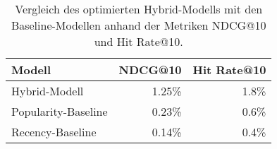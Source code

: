 
\begin{table}[htbp]
    \centering
    \caption{Vergleich des optimierten Hybrid-Modells mit den Baseline-Modellen anhand der Metriken NDCG@10 und Hit Rate@10.}
    \label{tab:baseline_vergleich}
    \begin{tabular}{lrr}
        \toprule
        \textbf{Modell} & \textbf{NDCG@10} & \textbf{Hit Rate@10} \\
        \midrule
        Hybrid-Modell & 1.25\% & 1.8\% \\
        Popularity-Baseline        & 0.23\% & 0.6\% \\
        Recency-Baseline           & 0.14\% & 0.4\% \\
        \bottomrule
    \end{tabular}
\end{table}